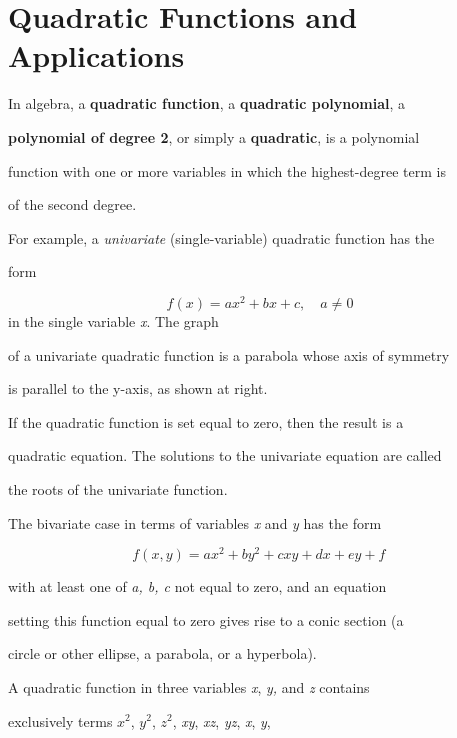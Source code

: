 \section{Quadratic Functions and Applications}
\label{sec:quadratic-functions-and-applications}

In algebra, a \textbf{quadratic function}, a \textbf{quadratic polynomial}, a

\textbf{polynomial of degree 2}, or simply a \textbf{quadratic}, is a polynomial

function with one or more variables in which the highest-degree term is

of the second degree.



For example, a \textit{univariate} (single-variable) quadratic function has the

form



$$f(x)=ax^2+bx+c,\quad a \ne 0$$ in the single variable \textit{x}. The graph

of a univariate quadratic function is a parabola whose axis of symmetry

is parallel to the y-axis, as shown at right.



If the quadratic function is set equal to zero, then the result is a

quadratic equation. The solutions to the univariate equation are called

the roots of the univariate function.



The bivariate case in terms of variables \textit{x} and \textit{y} has the form



$$f(x,y) = a x^2 + by^2 + cx y+ d x+ ey + f \,$$



with at least one of \textit{a, b, c} not equal to zero, and an equation

setting this function equal to zero gives rise to a conic section (a

circle or other ellipse, a parabola, or a hyperbola).



A quadratic function in three variables \textit{x}, \textit{y,} and \textit{z} contains

exclusively terms \textit{$x^2$}, \textit{$y^2$}, \textit{$z^2$}, \textit{xy}, \textit{xz}, \textit{yz}, \textit{x}, \textit{y},

